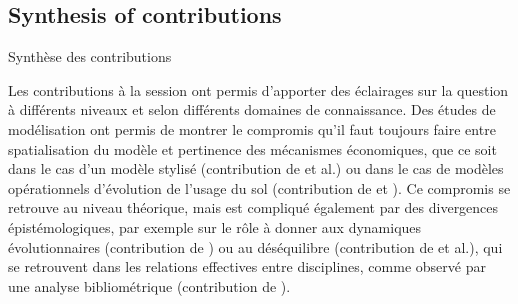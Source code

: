 \subsection*{Synthesis of contributions}{Synthèse des contributions}



Les contributions à la session ont permis d'apporter des éclairages sur la question à différents niveaux et selon différents domaines de connaissance. Des études de modélisation ont permis de montrer le compromis qu'il faut toujours faire entre spatialisation du modèle et pertinence des mécanismes économiques, que ce soit dans le cas d'un modèle stylisé (contribution de  et al.) ou dans le cas de modèles opérationnels d'évolution de l'usage du sol (contribution de  et ). Ce compromis se retrouve au niveau théorique, mais est compliqué également par des divergences épistémologiques, par exemple sur le rôle à donner aux dynamiques évolutionnaires (contribution de ) ou au déséquilibre (contribution de  et al.), qui se retrouvent dans les relations effectives entre disciplines, comme observé par une analyse bibliométrique (contribution de ).

